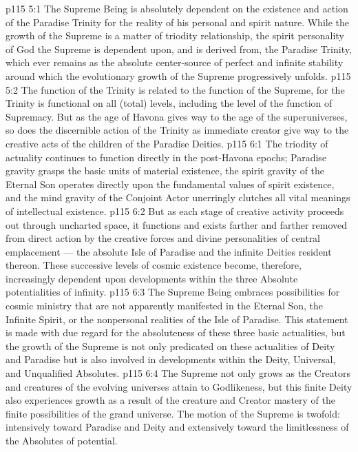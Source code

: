 \vs p115 5:1 The Supreme Being is absolutely dependent on the existence and action of the Paradise Trinity for the reality of his personal and spirit nature. While the growth of the Supreme is a matter of triodity relationship, the spirit personality of God the Supreme is dependent upon, and is derived from, the Paradise Trinity, which ever remains as the absolute center\hyp{}source of perfect and infinite stability around which the evolutionary growth of the Supreme progressively unfolds.
\vs p115 5:2 The function of the Trinity is related to the function of the Supreme, for the Trinity is functional on all (total) levels, including the level of the function of Supremacy. But as the age of Havona gives way to the age of the superuniverses, so does the discernible action of the Trinity as immediate creator give way to the creative acts of the children of the Paradise Deities.
\vs p115 6:1 The triodity of actuality continues to function directly in the post\hyp{}Havona epochs; Paradise gravity grasps the basic units of material existence, the spirit gravity of the Eternal Son operates directly upon the fundamental values of spirit existence, and the mind gravity of the Conjoint Actor unerringly clutches all vital meanings of intellectual existence.
\vs p115 6:2 But as each stage of creative activity proceeds out through uncharted space, it functions and exists farther and farther removed from direct action by the creative forces and divine personalities of central emplacement --- the absolute Isle of Paradise and the infinite Deities resident thereon. These successive levels of cosmic existence become, therefore, increasingly dependent upon developments within the three Absolute potentialities of infinity.
\vs p115 6:3 The Supreme Being embraces possibilities for cosmic ministry that are not apparently manifested in the Eternal Son, the Infinite Spirit, or the nonpersonal realities of the Isle of Paradise. This statement is made with due regard for the absoluteness of these three basic actualities, but the growth of the Supreme is not only predicated on these actualities of Deity and Paradise but is also involved in developments within the Deity, Universal, and Unqualified Absolutes.
\vs p115 6:4 \pc The Supreme not only grows as the Creators and creatures of the evolving universes attain to Godlikeness, but this finite Deity also experiences growth as a result of the creature and Creator mastery of the finite possibilities of the grand universe. The motion of the Supreme is twofold: intensively toward Paradise and Deity and extensively toward the limitlessness of the Absolutes of potential.
